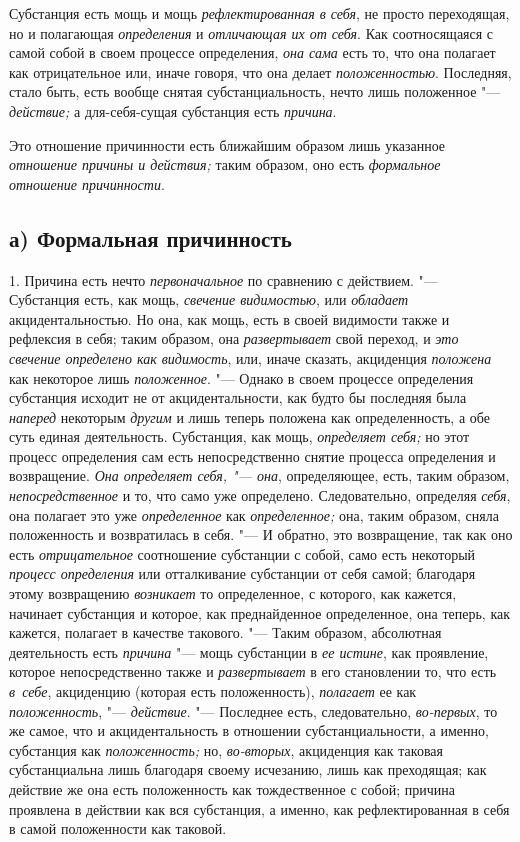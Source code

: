 Субстанция есть мощь и мощь
{\em рефлектированная в себя}, не просто переходящая,
но и полагающая {\em определения} и
{\em отличающая их от себя}. Как соотносящаяся с самой
собой в своем процессе определения, {\em она сама} есть
то, что она полагает как отрицательное или, иначе говоря, что она делает
{\em положенностью}. Последняя, стало быть, есть вообще
снятая субстанциальность, нечто лишь положенное
"--- {\em действие;} а для-себя-сущая субстанция есть {\em причина}.

Это отношение причинности есть ближайшим образом лишь указанное
{\em отношение причины и действия;} таким образом, оно
есть {\em формальное отношение причинности}.


\subsection[а) Формальная причинность]{а) Формальная причинность}

1. Причина есть нечто {\em первоначальное} по сравнению с действием. "---
Субстанция есть, как мощь, {\em свечение видимостью},
или {\em обладает} акцидентальностью. Но она, как мощь,
есть в своей видимости также и рефлексия в себя; таким образом, она
{\em развертывает} свой переход, и
{\em это свечение определено как видимость}, или, иначе
сказать, акциденция {\em положена} как некоторое лишь
{\em положенное}. "--- Однако в своем процессе определения
субстанция исходит не от акцидентальности, как будто бы последняя была
{\em наперед} некоторым {\em другим} и лишь теперь положена как определенность,
а обе суть единая деятельность. Субстанция, как мощь,
{\em определяет себя;} но этот процесс определения сам
есть непосредственно снятие процесса определения и возвращение.
{\em Она определяет себя, "--- она}, определяющее, есть,
таким образом, {\em непосредственное} и то, что само
уже определено. Следовательно, определяя {\em себя},
она полагает это уже {\em определенное} как
{\em определенное;} она, таким образом, сняла
положенность и возвратилась в себя. "--- И обратно, это возвращение, так как
оно есть {\em отрицательное} соотношение субстанции с
собой, само есть некоторый {\em процесс определения}
или отталкивание субстанции от себя самой; благодаря этому возвращению
{\em возникает} то определенное, с которого, как
кажется, начинает субстанция и которое, как преднайденное определенное, она
теперь, как кажется, полагает в качестве такового. "--- Таким образом,
абсолютная деятельность есть {\em причина} "--- мощь
субстанции в {\em ее истине}, как проявление, которое
непосредственно также и {\em развертывает} в его
становлении то, что есть {\em в~себе}, акциденцию
(которая есть положенность), {\em полагает} ее как {\em положенность}, "---
{\em действие}. "--- Последнее есть, следовательно,
{\em во-первых}, то же самое, что и акцидентальность в
отношении субстанциальности, а именно, субстанция как {\em положенность;}
но, {\em во-вторых}, акциденция как таковая субстанциальна
лишь благодаря своему исчезанию, лишь как преходящая; как действие же она
есть положенность как тождественное с собой; причина проявлена в действии
как вся субстанция, а именно, как рефлектированная в себя в самой
положенности как таковой.

